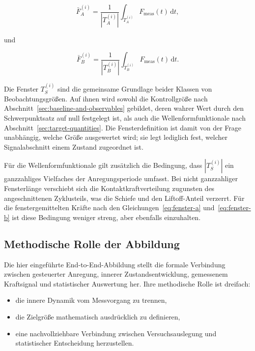 \documentclass[12pt,a4paper]{report}
\begin{document}
\begin{equation}
\bar{F}_{A}^{(i)}
=
\frac{1}{|T_A^{(i)}|}
\int_{T_A^{(i)}} F_{\mathrm{meas}}(t)\,\mathrm{d}t,
\label{eq:fenster-a}
\end{equation}

und

\begin{equation}
\bar{F}_{B}^{(i)}
=
\frac{1}{|T_B^{(i)}|}
\int_{T_B^{(i)}} F_{\mathrm{meas}}(t)\,\mathrm{d}t.
\label{eq:fenster-b}
\end{equation}

Die Fenster $T_S^{(i)}$ sind die gemeinsame Grundlage beider Klassen von
Beobachtungsgrößen. Auf ihnen wird sowohl die Kontrollgröße nach
Abschnitt~\ref{sec:baseline-and-observables} gebildet, deren wahrer Wert
durch den Schwerpunktsatz auf null festgelegt ist, als auch die
Wellenformfunktionale nach
Abschnitt~\ref{sec:target-quantities}. Die Fensterdefinition ist damit
von der Frage unabhängig, welche Größe ausgewertet wird; sie legt
lediglich fest, welcher Signalabschnitt einem Zustand zugeordnet ist.

Für die Wellenformfunktionale gilt zusätzlich die Bedingung, dass
$|T_S^{(i)}|$ ein ganzzahliges Vielfaches der Anregungsperiode umfasst.
Bei nicht ganzzahliger Fensterlänge verschiebt sich die
Kontaktkraftverteilung zugunsten des angeschnittenen Zyklusteils, was die
Schiefe und den Liftoff-Anteil verzerrt. Für die fenstergemittelten
Kräfte nach den Gleichungen~\eqref{eq:fenster-a}
und~\eqref{eq:fenster-b} ist diese Bedingung weniger streng, aber
ebenfalls einzuhalten.

\subsection{Methodische Rolle der Abbildung}

Die hier eingeführte End-to-End-Abbildung stellt die formale Verbindung
zwischen gesteuerter Anregung, innerer Zustandsentwicklung, gemessenem
Kraftsignal und statistischer Auswertung her. Ihre methodische Rolle ist
dreifach:

\begin{itemize}
\item die innere Dynamik vom Messvorgang zu trennen,
\item die Zielgröße mathematisch ausdrücklich zu definieren,
\item eine nachvollziehbare Verbindung zwischen Versuchsauslegung und
      statistischer Entscheidung herzustellen.
\end{itemize}
\end{document}
